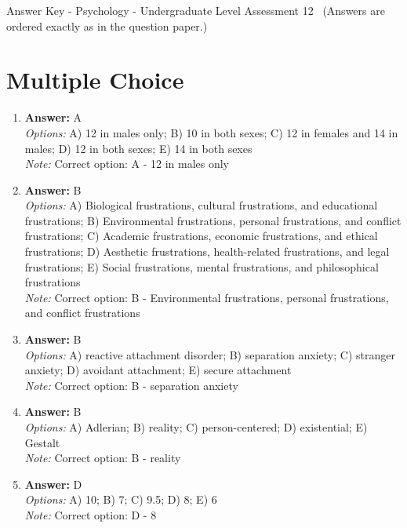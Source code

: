 \documentclass[12pt]{article}
\begin{document}
\begin{center}
Answer Key - Psychology - Undergraduate Level Assessment 12 \
\small (Answers are ordered exactly as in the question paper.)
\end{center}

\section*{Multiple Choice}
\begin{enumerate}[label=\arabic*.]
\item \textbf{Answer:} A
\\ \textit{Options:} A) 12 in males only; B) 10 in both sexes; C) 12 in females and 14 in males; D) 12 in both sexes; E) 14 in both sexes
\\ \textit{Note:} Correct option: A - 12 in males only
\item \textbf{Answer:} B
\\ \textit{Options:} A) Biological frustrations, cultural frustrations, and educational frustrations; B) Environmental frustrations, personal frustrations, and conflict frustrations; C) Academic frustrations, economic frustrations, and ethical frustrations; D) Aesthetic frustrations, health-related frustrations, and legal frustrations; E) Social frustrations, mental frustrations, and philosophical frustrations
\\ \textit{Note:} Correct option: B - Environmental frustrations, personal frustrations, and conflict frustrations
\item \textbf{Answer:} B
\\ \textit{Options:} A) reactive attachment disorder; B) separation anxiety; C) stranger anxiety; D) avoidant attachment; E) secure attachment
\\ \textit{Note:} Correct option: B - separation anxiety
\item \textbf{Answer:} B
\\ \textit{Options:} A) Adlerian; B) reality; C) person-centered; D) existential; E) Gestalt
\\ \textit{Note:} Correct option: B - reality
\item \textbf{Answer:} D
\\ \textit{Options:} A) 10; B) 7; C) 9.5; D) 8; E) 6
\\ \textit{Note:} Correct option: D - 8
\end{enumerate}
\end{document}
